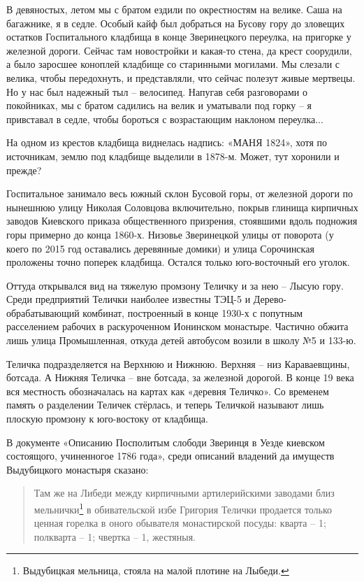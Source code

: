 В девяностых, летом мы с братом ездили по окрестностям на велике. Саша на багажнике, я в седле. Особый кайф был добраться на Бусову гору до зловещих остатков Госпитального кладбища в конце Зверинецкого переулка, на пригорке у железной дороги. Сейчас там новостройки и какая-то стена, да крест соорудили, а было заросшее коноплей кладбище со старинными могилами. Мы слезали с велика, чтобы передохнуть, и представляли, что сейчас полезут живые мертвецы. Но у нас был надежный тыл – велосипед. Напугав себя разговорами о покойниках, мы с братом садились на велик и уматывали под горку – я привставал в седле, чтобы бороться с возрастающим наклоном переулка...

На одном из крестов кладбища виднелась надпись: «МАНЯ 1824», хотя по источникам, землю под кладбище выделили в 1878-м. Может, тут хоронили и прежде?

Госпитальное занимало весь южный склон Бусовой горы, от железной дороги по нынешнюю улицу Николая Соловцова включительно, покрыв глинища кирпичных заводов Киевского приказа общественного призрения, стоявшими вдоль подножия горы примерно до конца 1860-х. Низовье Зверинецкой улицы от поворота (у коего по 2015 год оставались деревянные домики) и улица Сорочинская проложены точно поперек кладбища. Остался только юго-восточный его уголок.

Оттуда открывался вид на тяжелую промзону Теличку и за нею – Лысую гору. Среди предприятий Телички наиболее известны ТЭЦ-5 и Дерево-обрабатывающий комбинат, построенный в конце 1930-х с попутным расселением рабочих в раскуроченном Ионинском монастыре. Частично обжита лишь улица Промышленная, откуда детей автобусом возили в школу №5 и 133-ю. 

Теличка подразделяется на Верхнюю и Нижнюю. Верхняя – низ Караваевщины, ботсада. А Нижняя Теличка – вне ботсада, за железной дорогой. В конце 19 века вся местность обозначалась на картах как «деревня Теличко». Со временем память о разделении Теличек стёрлась, и теперь Теличкой называют лишь плоскую промзону к юго-востоку от кладбища. 

В документе «Описанию Посполитым слободи Зверинця в Уезде киевском состоящого, учиненногое 1786 года», среди описаний владений да имуществ Выдубицкого монастыря сказано:

\begin{quotation}
Там же на Либеди между кирпичными артилерийскими заводами близ мельнички\footnote{Выдубицкая мельница, стояла на малой плотине на Лыбеди.} в обивательской избе Григория Телички продается только ценная горелка в оного обывателя монастирской посуды: кварта – 1; полкварта – 1; чвертка – 1, жестяныя.\end{quotation}

